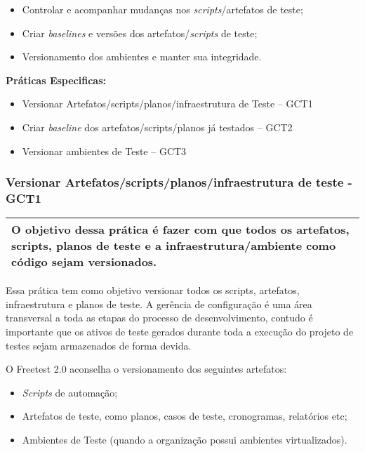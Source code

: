 \begin{itemize}
    \item Controlar e acompanhar mudanças nos \textit{scripts}/artefatos de teste;
    \item Criar \textit{baselines} e versões dos artefatos/\textit{scripts} de teste;
    \item Versionamento dos ambientes e manter sua integridade.
\end{itemize}

\textbf{Práticas Especificas: }
\begin{itemize}
    \item Versionar Artefatos/scripts/planos/infraestrutura de Teste – GCT1
    \item Criar \textit{baseline} dos artefatos/scripts/planos já testados – GCT2
    \item Versionar ambientes de Teste – GCT3
\end{itemize}

\subsubsection{ Versionar Artefatos/scripts/planos/infraestrutura de teste - GCT1 }
\label{sec:gct1}

\begin{table}[H]
\centering
\begin{tabular}{|p{130mm}|}
\hline
O objetivo dessa prática é fazer com que todos os artefatos, scripts, planos de teste e a infraestrutura/ambiente como código sejam versionados. \\ 
\hline
\end{tabular}
\end{table}

Essa prática tem como objetivo versionar todos os scripts, artefatos, infraestrutura e planos de teste. A gerência de configuração é uma área transversal a toda as etapas do processo de desenvolvimento, contudo é importante que os ativos de teste gerados durante toda a execução do projeto de testes sejam armazenados de forma devida.

O Freetest 2.0 aconselha o versionamento dos seguintes artefatos:

\begin{itemize}
    \item \textit{Scripts} de automação;
    \item Artefatos de teste, como planos, casos de teste, cronogramas, relatórios etc;
    \item Ambientes de Teste (quando a organização possui ambientes virtualizados).
\end{itemize}

